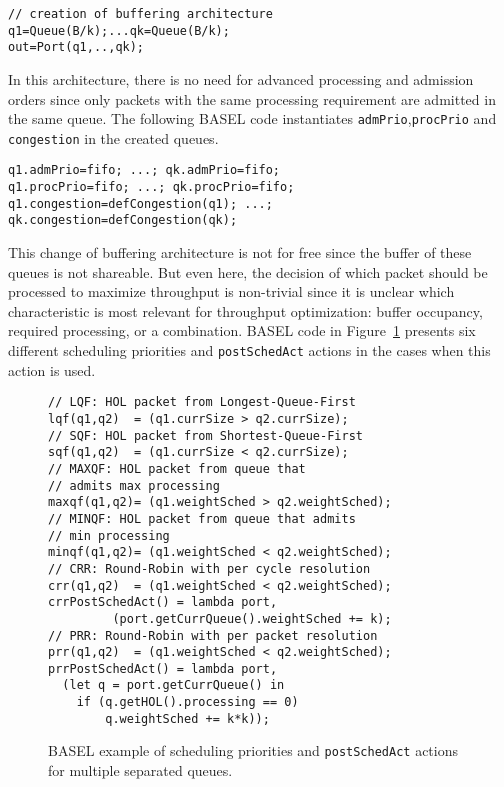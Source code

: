 \documentclass{article}
\newcommand{\barch}{BASEL}
\begin{document}
\begin{lstlisting}[basicstyle=\ttfamily\footnotesize]
// creation of buffering architecture
q1=Queue(B/k);...qk=Queue(B/k); 
out=Port(q1,..,qk);
\end{lstlisting}



In this architecture, there is no need for advanced processing and admission orders since only packets with the same processing requirement are admitted in the same queue. 
The following \barch{} code instantiates \lstinline|admPrio|,\linebreak \lstinline|procPrio| and \lstinline|congestion|  in the  created  queues.

\begin{lstlisting}[basicstyle=\ttfamily\footnotesize]
q1.admPrio=fifo; ...; qk.admPrio=fifo;
q1.procPrio=fifo; ...; qk.procPrio=fifo;
q1.congestion=defCongestion(q1); ...; 
qk.congestion=defCongestion(qk);
\end{lstlisting}


This change of buffering architecture is not for free since the buffer of these queues is not shareable. But even here, the decision of which packet should be processed to maximize throughput is non-trivial since it is unclear which characteristic is most relevant for throughput optimization: buffer occupancy, required processing, or a combination. 
\barch{} code in Figure~\ref{list:priosandactions} presents six different scheduling priorities and \lstinline|postSchedAct| actions in the cases when this action is used. 

\begin{figure}[h]
\begin{lstlisting}[frame=tb,basicstyle=\ttfamily\small,deletekeywords={packet,queue},belowskip=0em]
// LQF: HOL packet from Longest-Queue-First
lqf(q1,q2)  = (q1.currSize > q2.currSize);
// SQF: HOL packet from Shortest-Queue-First
sqf(q1,q2)  = (q1.currSize < q2.currSize);
// MAXQF: HOL packet from queue that 
// admits max processing
maxqf(q1,q2)= (q1.weightSched > q2.weightSched);
// MINQF: HOL packet from queue that admits 
// min processing
minqf(q1,q2)= (q1.weightSched < q2.weightSched);
// CRR: Round-Robin with per cycle resolution
crr(q1,q2)  = (q1.weightSched < q2.weightSched);
crrPostSchedAct() = lambda port, 
         (port.getCurrQueue().weightSched += k);
// PRR: Round-Robin with per packet resolution
prr(q1,q2)  = (q1.weightSched < q2.weightSched);
prrPostSchedAct() = lambda port, 
  (let q = port.getCurrQueue() in 
    if (q.getHOL().processing == 0) 
        q.weightSched += k*k));
\end{lstlisting}
\caption{\barch{} example of scheduling priorities and \lstinline|postSchedAct| actions for multiple separated queues.}\label{list:priosandactions}
\end{figure}
\end{document}
